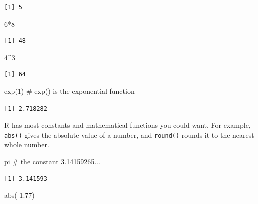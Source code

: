 \documentclass[
  letterpaper,
  DIV=11,
  numbers=noendperiod]{scrreprt}
\newenvironment{Shaded}{\begin{snugshade}}{\end{snugshade}}
\newcommand{\CommentTok}[1]{\textcolor[rgb]{0.37,0.37,0.37}{#1}}
\newcommand{\DecValTok}[1]{\textcolor[rgb]{0.68,0.00,0.00}{#1}}
\newcommand{\FloatTok}[1]{\textcolor[rgb]{0.68,0.00,0.00}{#1}}
\newcommand{\FunctionTok}[1]{\textcolor[rgb]{0.28,0.35,0.67}{#1}}
\newcommand{\NormalTok}[1]{\textcolor[rgb]{0.00,0.23,0.31}{#1}}
\newcommand{\SpecialCharTok}[1]{\textcolor[rgb]{0.37,0.37,0.37}{#1}}
\begin{document}
\begin{verbatim}
[1] 5
\end{verbatim}

\begin{Shaded}
\begin{Highlighting}[]
\DecValTok{6}\SpecialCharTok{*}\DecValTok{8}
\end{Highlighting}
\end{Shaded}

\begin{verbatim}
[1] 48
\end{verbatim}

\begin{Shaded}
\begin{Highlighting}[]
\DecValTok{4}\SpecialCharTok{\^{}}\DecValTok{3}
\end{Highlighting}
\end{Shaded}

\begin{verbatim}
[1] 64
\end{verbatim}

\begin{Shaded}
\begin{Highlighting}[]
\FunctionTok{exp}\NormalTok{(}\DecValTok{1}\NormalTok{)   }\CommentTok{\# exp() is the exponential function}
\end{Highlighting}
\end{Shaded}

\begin{verbatim}
[1] 2.718282
\end{verbatim}

R has most constants and mathematical functions you could want. For
example, \texttt{abs()} gives the absolute value of a number, and
\texttt{round()} rounds it to the nearest whole number.

\begin{Shaded}
\begin{Highlighting}[]
\NormalTok{pi     }\CommentTok{\# the constant 3.14159265...}
\end{Highlighting}
\end{Shaded}

\begin{verbatim}
[1] 3.141593
\end{verbatim}

\begin{Shaded}
\begin{Highlighting}[]
\FunctionTok{abs}\NormalTok{(}\SpecialCharTok{{-}}\FloatTok{1.77}\NormalTok{)}
\end{Highlighting}
\end{Shaded}
\end{document}
